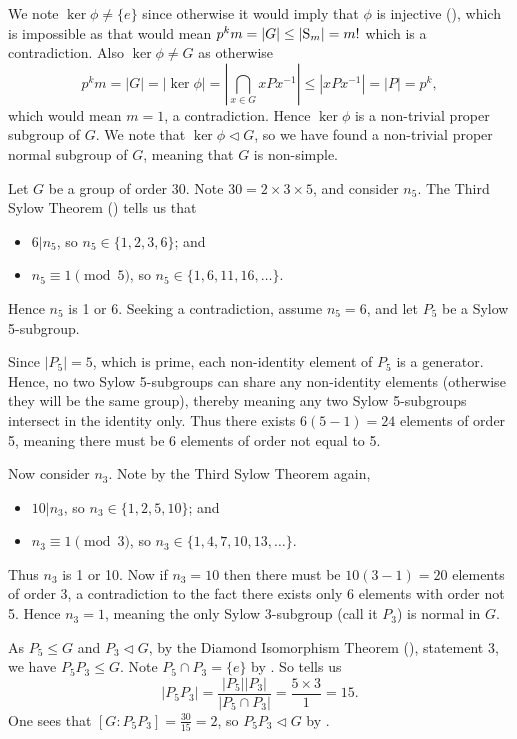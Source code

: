 \begin{questions}
    We note $\ker\phi \neq \{e\}$ since otherwise it would imply that $\phi$ is injective (), which is impossible as that would mean $p^km = |G| \leq |\mathrm{S}_{m}| = m!$ which is a contradiction. Also $\ker\phi \neq G$ as otherwise
    \[
        p^km = |G| = |\ker\phi| = \left|\bigcap_{x \in G} xPx^{-1}\right| \leq |xPx^{-1}| = |P| = p^k,
    \]
    which would mean $m = 1$, a contradiction. Hence $\ker\phi$ is a non-trivial proper subgroup of $G$. We note that $\ker\phi \lhd G$, so we have found a non-trivial proper normal subgroup of $G$, meaning that $G$ is non-simple.

    \item Let $G$ be a group of order 30. Note $30 = 2 \times 3 \times 5$, and consider $n_5$. The Third Sylow Theorem () tells us that
    \begin{itemize}
        \item $6 \vert n_5$, so $n_5 \in \{1, 2, 3, 6\}$; and
        \item $n_5 \equiv 1 \pmod 5$, so $n_5 \in \{1, 6, 11, 16, \dots\}$.
    \end{itemize}
    Hence $n_5$ is 1 or 6. Seeking a contradiction, assume $n_5 = 6$, and let $P_5$ be a Sylow 5-subgroup.

    Since $|P_5| = 5$, which is prime, each non-identity element of $P_5$ is a generator. Hence, no two Sylow 5-subgroups can share any non-identity elements (otherwise they will be the same group), thereby meaning any two Sylow 5-subgroups intersect in the identity only. Thus there exists $6(5-1) = 24$ elements of order 5, meaning there must be 6 elements of order not equal to 5.

    Now consider $n_3$. Note by the Third Sylow Theorem again,
    \begin{itemize}
        \item $10 \vert n_3$, so $n_3 \in \{1, 2, 5, 10\}$; and
        \item $n_3 \equiv 1 \pmod 3$, so $n_3 \in \{1, 4, 7, 10, 13, \dots\}$.
    \end{itemize}
    Thus $n_3$ is 1 or 10. Now if $n_3 = 10$ then there must be $10(3-1) = 20$ elements of order 3, a contradiction to the fact there exists only 6 elements with order not 5. Hence $n_3 = 1$, meaning the only Sylow 3-subgroup (call it $P_3$) is normal in $G$.

    As $P_5 \leq G$ and $P_3 \lhd G$, by the Diamond Isomorphism Theorem (), statement 3, we have $P_5P_3 \leq G$. Note $P_5 \cap P_3 = \{e\}$ by . So  tells us
    \[
        |P_5P_3| = \frac{|P_5||P_3|}{|P_5 \cap P_3|} = \frac{5\times3}{1} = 15.
    \]
    One sees that $[G:P_5P_3] = \frac{30}{15} = 2$, so $P_5P_3 \lhd G$ by .


\end{questions}
